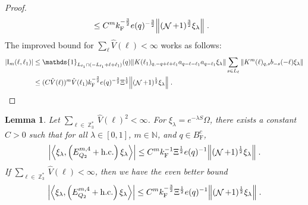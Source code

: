 \documentclass[12pt,a4paper]{article}
\numberwithin{equation}{section}
\newcommand{\NNN}{\mathbb{N}}
\newcommand{\1}{\mathbb{I}}
\newcommand{\F}{\mathrm{F}}
\newcommand{\I}{\mathrm{I}}
\DeclareMathOperator{\Z}{\mathbb{Z}}
\DeclareMathOperator{\NN}{\mathcal{N}}
\newcommand{\half}{\frac{1}{2}}
\newcommand{\eva}[1]{\left\langle #1 \right\rangle}
\theoremstyle{plain}
\newtheorem{lemma}[theorem]{Lemma}
\theoremstyle{definition}
\theoremstyle{remark}
\theoremstyle{plain}
\theoremstyle{definition}
\theoremstyle{remark}
\begin{document}
\begin{proof}
{\begin{align}
	&\leq C^m k_{\F}^{-\frac 32} e(q)^{-\frac 32}
		\norm{(\NN+1)^{\frac 32} \xi_\lambda} \;. \label{eq:estEQ2153_Coulomb}
\end{align}
The improved bound for $ \sum_\ell \hat{V}(\ell) < \infty $ works as follows:}
\begin{align}
	|\I_m(\ell, \ell_1)|
	&\leq \mathds{1}_{L_{\ell_1} \cap (-L_{\ell_1} + \ell + \ell_1)}(q) \norm{K(\ell_1)_{q,-q+\ell+\ell_1} a_{q-\ell-\ell_1} a_{q-\ell_1} \xi_\lambda}
		\sum\limits_{ s \in L_{\ell}}
		\norm{ K^m(\ell)_{q,s} b_{-s}(-\ell) \xi_\lambda }\nonumber\\
	&\leq (C \hat{V}(\ell))^m
		\hat{V}(\ell_1)
		k_{\F}^{-\frac 32} e(q)^{-\frac 32} \Xi^\half
		\norm{(\NN+1)^\half\xi_\lambda} \;. \label{eq:estEQ2153}
\end{align}
\end{proof}


\begin{lemma} \label{lem:EQ217}
Let $ \sum_{\ell \in \Z_3^*} \hat{V}(\ell)^2 < \infty $. For $\xi_\lambda = e^{-\lambda S} \Omega$, there exists a constant $ C > 0 $ such that for all $ \lambda \in [0,1] $, $ m \in \NNN $, and $ q \in B_{\F}^c $,
\begin{align}
	\abs{\eva{\xi_\lambda,\left(E^{m,4}_{Q_2}+\mathrm{h.c.}\right) \xi_\lambda }}
	\leq C^m k_{\F}^{-1} \Xi^{\half}  e(q)^{-1} 
		\norm{(\NN+1)^\half \xi_\lambda } \;. \label{eq:estEQ217_Coulomb}
\end{align}
If $ \sum_{\ell \in \Z_3^*} \hat{V}(\ell) < \infty $, then we have the even better bound
\begin{align}
	\abs{\eva{\xi_\lambda,\left(E^{m,4}_{Q_2}+\mathrm{h.c.}\right) \xi_\lambda }}
	\leq C^m k_{\F}^{-\frac 32} \Xi^{\half}  e(q)^{-1} 
		\norm{(\NN+1)^\half \xi_\lambda } \;. \label{eq:estEQ217}
\end{align}
\end{lemma}
\end{document}

